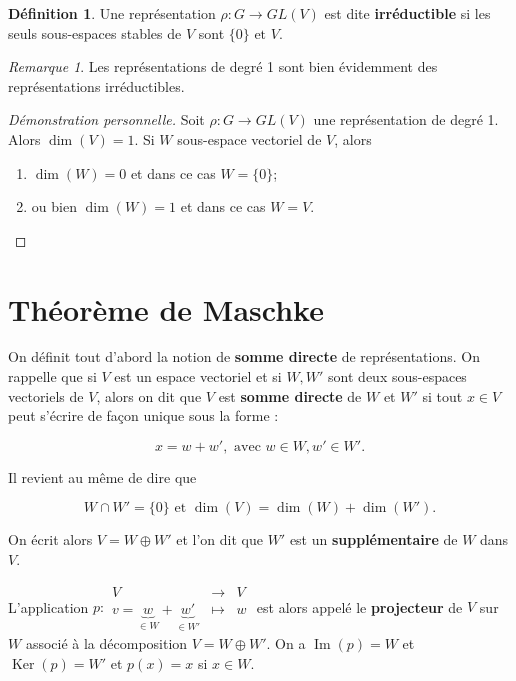 \documentclass[french]{book}
\theoremstyle{definition}
\newtheorem{protodefinition}{Définition}[section]
\newenvironment{definition}
    {\colorlet{shadecolor}{green!5}\begin{shaded}\begin{protodefinition}}
    {\end{protodefinition}\end{shaded}}
\theoremstyle{remark}
\newtheorem*{remark}{Remarque}
\begin{document}
\begin{definition}
  Une représentation \(\rho : G \to GL(V)\) est dite \textbf{irréductible} si les seuls sous-espaces stables de \(V\) sont \(\{0\} \text{ et } V\).
\end{definition}

\begin{remark}
  Les représentations de degré 1 sont bien évidemment des représentations irréductibles.
\end{remark}

\begin{proof}[Démonstration personnelle]
  Soit \(\rho : G \to GL(V)\) une représentation de degré 1. Alors \(\operatorname{dim}(V) = 1\). Si \(W\) sous-espace vectoriel de \(V\), alors
  \begin{enumerate}
    \item \(\operatorname{dim}(W)=0\) et dans ce cas \(W = \{ 0 \} \);
    \item ou bien \(\operatorname{dim}(W)=1\) et dans ce cas \(W = V\).
  \end{enumerate}
\end{proof}

\section{Théorème de Maschke}

On définit tout d'abord la notion de \textbf{somme directe} de représentations. On rappelle que si \(V\) est un espace vectoriel et si \(W, W'\) sont deux sous-espaces vectoriels de \(V\), alors on dit que \(V\) est \textbf{somme directe} de \(W\) et \(W'\) si tout \(x \in V\) peut s'écrire de façon unique sous la forme :

\[x = w+w', \text{ avec } w \in W, w' \in W'. \]

Il revient au même de dire que

\[W \cap W' = \{ 0 \} \text{ et } \operatorname{dim}(V) = \operatorname{dim}(W)+ \operatorname{dim}(W').\]

On écrit alors \(V = W \oplus W'\) et l'on dit que \(W'\) est un \textbf{supplémentaire} de \(W\) dans \(V\).

L'application \(p : \begin{matrix}
  V & \longrightarrow & V \\
  v = \underbrace{w}_{\in W} + \underbrace{w'}_{\in W'} & \longmapsto & w
\end{matrix}\) est alors appelé le \textbf{projecteur} de \(V\) sur \(W\) associé à la décomposition \(V = W \oplus W'\). On a \(\operatorname{Im}(p) = W\) et \(\operatorname{Ker}(p) = W'\) et \(p(x) = x\) si \(x \in W\).
\end{document}
